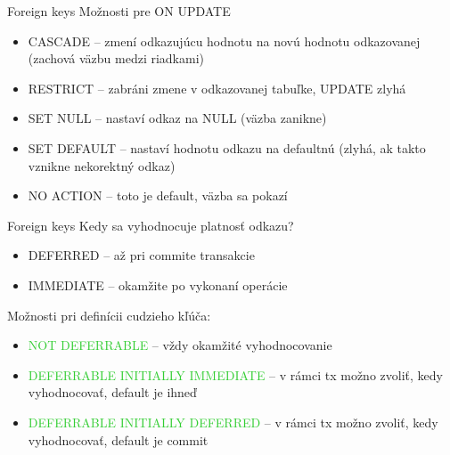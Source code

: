 \documentclass[12pt]{beamer}
\def\blue#1{\textcolor{Cerulean}{#1}}
\def\green#1{\textcolor{LimeGreen}{#1}}
\begin{document}
\begin{frame}[fragile]{Foreign keys}
Možnosti pre \blue{ON UPDATE}
\begin{itemize}
\item \alert{CASCADE} -- zmení odkazujúcu hodnotu na novú hodnotu odkazovanej
(zachová väzbu medzi riadkami)
\item RESTRICT -- zabráni zmene v odkazovanej tabuľke, UPDATE zlyhá
\item SET NULL -- nastaví odkaz na NULL (väzba zanikne)
\item SET DEFAULT -- nastaví hodnotu odkazu na defaultnú
(zlyhá, ak takto vznikne nekorektný odkaz)
\item NO ACTION -- toto je default, väzba sa pokazí
\end{itemize}
\end{frame}

\begin{frame}[fragile]{Foreign keys}
Kedy sa vyhodnocuje platnosť odkazu?
\begin{itemize}
\item \alert{DEFERRED} -- až pri commite transakcie
\item \alert{IMMEDIATE} -- okamžite po vykonaní operácie
\end{itemize}
\pause
Možnosti pri definícii cudzieho kľúča:
\begin{itemize}
\item \green{NOT DEFERRABLE} -- vždy okamžité vyhodnocovanie
\item \green{DEFERRABLE INITIALLY IMMEDIATE} -- v rámci tx možno zvoliť, kedy vyhodnocovať, default je ihneď
\item \green{DEFERRABLE INITIALLY DEFERRED} -- v rámci tx možno zvoliť, kedy vyhodnocovať, default je commit
\end{itemize}
\end{frame}
\end{document}
